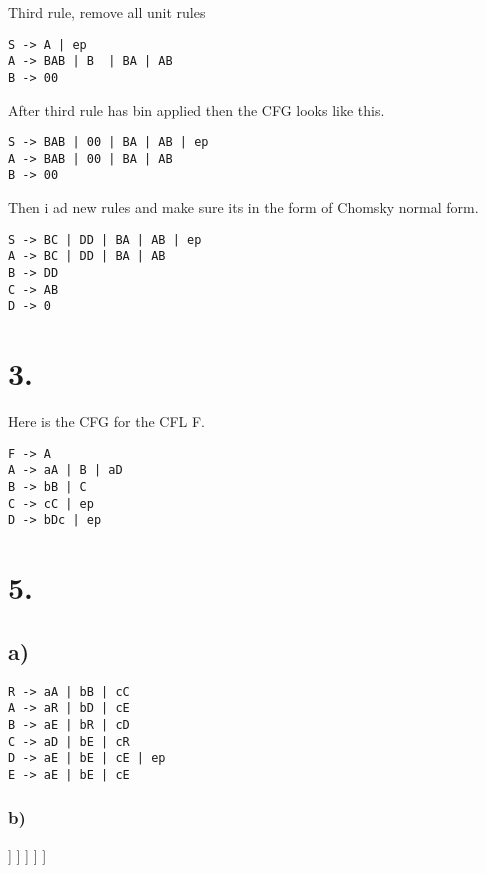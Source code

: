 \documentclass[]{article}
\begin{document}
Third rule, remove all unit rules
\begin{lstlisting}
S -> A | ep
A -> BAB | B  | BA | AB
B -> 00 
\end{lstlisting}
After third rule has bin applied then the CFG looks like this.
\begin{lstlisting}
S -> BAB | 00 | BA | AB | ep
A -> BAB | 00 | BA | AB
B -> 00 
\end{lstlisting}
Then i ad new rules and make sure its in the form of Chomsky normal form.
\begin{lstlisting}
S -> BC | DD | BA | AB | ep
A -> BC | DD | BA | AB
B -> DD
C -> AB
D -> 0
\end{lstlisting}
\section*{3.}
Here is the CFG for the CFL F.
\begin{lstlisting}
F -> A 
A -> aA | B | aD
B -> bB | C
C -> cC | ep
D -> bDc | ep
\end{lstlisting}
\section*{5.}
\subsection*{a)}
\begin{lstlisting}
R -> aA | bB | cC
A -> aR | bD | cE
B -> aE | bR | cD
C -> aD | bE | cR
D -> aE | bE | cE | ep
E -> aE | bE | cE
\end{lstlisting}
\subsubsection*{b)}
\begin{forest}
[R
	[b]
	[B 	
		[b]
		[R
			[b]
			[B
				[c]
				[D [$\epsilon$]]			
			]		
		]
	]
]
\end{forest}
\end{document}
